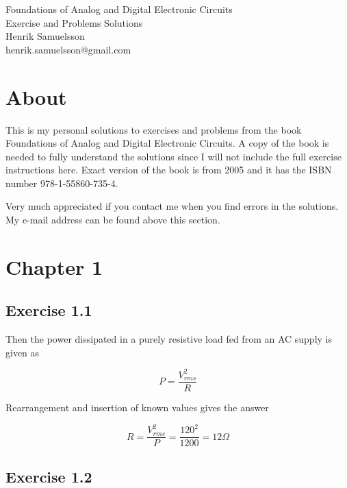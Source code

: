 \documentclass[]{article}
\begin{document}
\begingroup  
	\raggedright
	\Large Foundations of Analog and Digital Electronic Circuits\\
	\Large Exercise and Problems Solutions\\
	\vspace{3mm} %
	\normalsize Henrik Samuelsson\\
	\normalsize henrik.samuelsson@gmail.com
\endgroup
	
\section*{About}
	This is my personal solutions to exercises and problems from the book Foundations of Analog and Digital Electronic Circuits. A copy of the book is needed to fully understand the solutions since I will not include the full exercise instructions here. Exact version of the book is from 2005 and it has the ISBN number 978-1-55860-735-4. 
	
	Very much appreciated if you contact me when you find errors in the solutions. My e-mail address can be found above this section.

\section*{Chapter 1}

\subsection*{Exercise 1.1}
	
	Then the power dissipated in a purely resistive load fed from an AC supply is given as
	
	\begin{equation*}
		P = \dfrac{ V^{2}_{rms} }{ R }
	\end{equation*}
		
	Rearrangement and insertion of known values gives the answer
	
	\begin{equation*}
		R = \dfrac{ V^{2}_{rms} }{ P } = \dfrac{ 120^{2} }{ 1200 } = 12 \Omega
	\end{equation*}	

\subsection*{Exercise 1.2}
\end{document}
